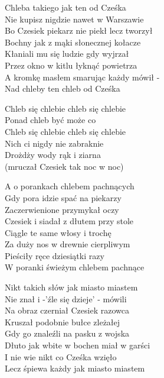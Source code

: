 
\begin{text}
    Chleba takiego jak ten od Cześka\\
    Nie kupisz nigdzie nawet w Warszawie\\
    Bo Czesiek piekarz nie piekł lecz tworzył\\
    Bochny jak z mąki słonecznej kołacze\\
    Kłaniali mu się ludzie gdy wyjrzał\\
    Przez okno w kitlu łyknąć powietrza\\
    A kromkę masłem smarując każdy mówił -\\
    Nad chleby ten chleb od Cześka

    \vin Chleb się chlebie chleb się chlebie\\
    \vin Ponad chleb być może co\\
    \vin Chleb się chlebie chleb się chlebie\\
    \vin Nich ci nigdy nie zabraknie\\
    \vin Drożdży wody rąk i ziarna\\
    \vin (mruczał Czesiek tak noc w noc)

    A o porankach chlebem pachnących\\
    Gdy pora idzie spać na piekarzy\\
    Zaczerwienione przymykał oczy\\
    Czesiek i siadał z dłutem przy stole\\
    Ciągle te same włosy i trochę\\
    Za duży nos w drewnie cierpliwym\\
    Pieściły ręce dziesiątki razy\\
    W poranki świeżym chlebem pachnące

    Nikt takich słów jak miasto miastem\\
    Nie znał i -'źle się dzieje' - mówili\\
    Na obraz czerniał Czesiek razowca\\
    Kruszał podobnie bułce zleżałej\\
    Gdy go znaleźli na pasku z wojska\\
    Dłuto jak wbite w bochen miał w garści\\
    I nie wie nikt co Cześka wzięło\\
    Lecz śpiewa każdy jak miasto miastem
\end{text}
